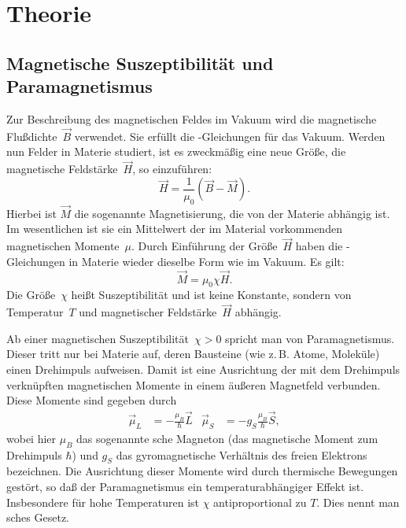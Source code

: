 
\section{Theorie}

\subsection{Magnetische Suszeptibilität und Paramagnetismus}

Zur Beschreibung des magnetischen Feldes im Vakuum wird die magnetische
Flußdichte~$\vec{B}$ verwendet.  Sie erfüllt die
-Gleichungen für das Vakuum.  Werden nun Felder in Materie
studiert, ist es zweckmäßig eine neue Größe, die magnetische
Feldstärke~$\vec{H}$, so einzuführen:
\begin{equation}
  \vec{H} = \frac{1}{\mu_0}(\vec{B} - \vec{M}).
\end{equation}
Hierbei ist $\vec{M}$ die sogenannte Magnetisierung, die von der Materie
abhängig ist.  Im wesentlichen ist sie ein Mittelwert der im Material
vorkommenden magnetischen Momente~$\mu$.  Durch Einführung der
Größe~$\vec{H}$ haben die -Gleichungen in Materie wieder
dieselbe Form wie im Vakuum.  Es gilt:
\begin{equation}
  \vec{M} = \mu_0 \chi \vec{H}.
\end{equation}
Die Größe~$\chi$ heißt Suszeptibilität und ist keine Konstante, sondern
von Temperatur~$T$ und magnetischer Feldstärke~$\vec{H}$ abhängig.

Ab einer magnetischen Suszeptibilität~$\chi>0$ spricht man von
Paramagnetismus.  Dieser tritt nur bei Materie auf, deren Bausteine (wie
z.\,B. Atome, Moleküle) einen Drehimpuls aufweisen.  Damit ist eine
Ausrichtung der mit dem Drehimpuls verknüpften magnetischen Momente in
einem äußeren Magnetfeld verbunden.  Diese Momente sind gegeben durch
\begin{align}
  \vec\mu_L &= -\frac{\mu_B}{\hbar} \vec{L} &
  \vec\mu_S &= -g_S\frac{\mu_B}{\hbar} \vec{S},
\end{align}
wobei hier $\mu_B$ das sogenannte sche Magneton (das
magnetische Moment zum Drehimpuls $\hbar$) und $g_S$ das gyromagnetische
Verhältnis des freien Elektrons bezeichnen.  Die Ausrichtung dieser
Momente wird durch thermische Bewegungen gestört, so daß der
Paramagnetismus ein temperaturabhängiger Effekt ist.  Insbesondere für
hohe Temperaturen ist $\chi$ antiproportional zu $T$.  Dies nennt man
sches Gesetz.

